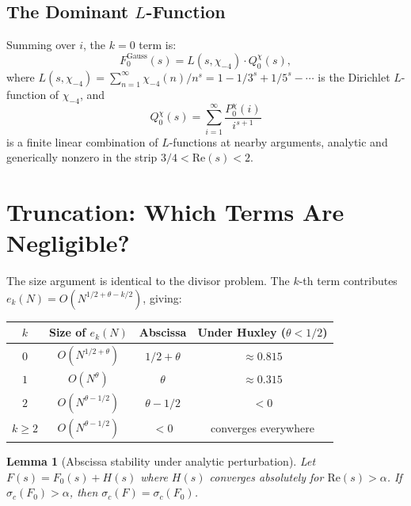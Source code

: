 \documentclass[12pt]{article}
\newtheorem{lemma}[theorem]{Lemma}
\theoremstyle{definition}
\begin{document}
\subsection{The Dominant $L$-Function}

Summing over $i$, the $k=0$ term is:
\begin{equation}
    F_0^{\text{Gauss}}(s) = L(s,\chi_{-4}) \cdot Q_0^{\chi}(s),
    \label{eq:FGmain}
\end{equation}
where $L(s,\chi_{-4}) = \sum_{n=1}^\infty \chi_{-4}(n)/n^s
= 1 - 1/3^s + 1/5^s - \cdots$ is the Dirichlet $L$-function of $\chi_{-4}$,
and
\begin{equation}
    Q_0^{\chi}(s) = \sum_{i=1}^\infty \frac{P_0^{\chi}(i)}{i^{s+1}}
    \label{eq:Q0chi}
\end{equation}
is a finite linear combination of $L$-functions at nearby arguments,
analytic and generically nonzero in the strip $3/4 < \mathrm{Re}(s) < 2$.

\section{Truncation: Which Terms Are Negligible?}

The size argument is identical to the divisor problem.  The $k$-th term
contributes $e_k(N) = O(N^{1/2+\theta-k/2})$, giving:

\begin{center}
\begin{tabular}{cccc}
\toprule
$k$ & Size of $e_k(N)$ & Abscissa & Under Huxley ($\theta < 1/2$)\\
\midrule
$0$ & $O(N^{1/2+\theta})$ & $1/2+\theta$ & $\approx 0.815$\\
$1$ & $O(N^{\theta})$ & $\theta$ & $\approx 0.315$\\
$2$ & $O(N^{\theta-1/2})$ & $\theta-1/2$ & $< 0$\\
$k\ge 2$ & $O(N^{\theta-1/2})$ & $< 0$ & converges everywhere\\
\bottomrule
\end{tabular}
\end{center}

\begin{lemma}[Abscissa stability under analytic perturbation]
\label{lem:abscissa}
Let $F(s) = F_0(s) + H(s)$ where $H(s)$ converges absolutely for
$\mathrm{Re}(s) > \alpha$.  If $\sigma_c(F_0) > \alpha$, then
$\sigma_c(F) = \sigma_c(F_0)$.
\end{lemma}
\end{document}
